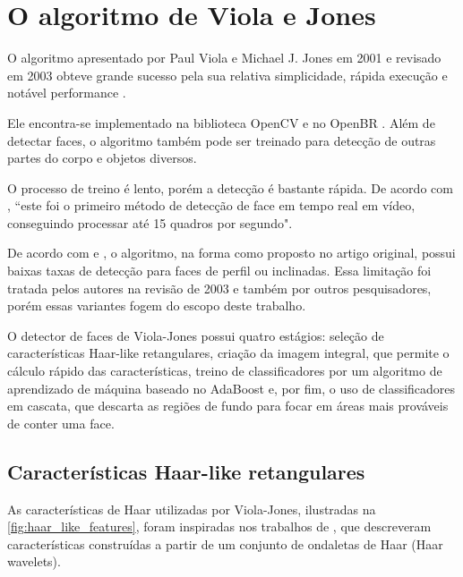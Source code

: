 \chapter{O algoritmo de Viola e Jones}\label{cap:viola_jones}


O algoritmo apresentado por Paul Viola e Michael J. Jones em 2001 \cite{Viola01rapidobject, viola2004robust} e revisado em 2003 \cite{jones2003fast} obteve grande sucesso pela sua relativa simplicidade, rápida execução e notável performance \cite{jensen2008implementing}.

Ele encontra-se implementado na biblioteca OpenCV \cite{bradski2000intel, opencvdocs} e no OpenBR \cite{klontz2013open}. Além de detectar faces, o algoritmo também pode ser treinado para detecção de outras partes do corpo \cite{mustafa2014obscenity} e objetos diversos.

O processo de treino é lento, porém a detecção é bastante rápida. De acordo com , ``este foi o primeiro método de detecção de face em tempo real em vídeo, conseguindo processar até 15 quadros por segundo".

De acordo com  e , o algoritmo, na forma como proposto no artigo original, possui baixas taxas de detecção para faces de perfil ou inclinadas. Essa limitação foi tratada pelos autores na revisão de 2003 \cite{jones2003fast} e também por outros pesquisadores, porém essas variantes fogem do escopo deste trabalho.

O detector de faces de Viola-Jones possui quatro estágios: seleção de características Haar-like retangulares, criação da imagem integral, que permite o cálculo rápido das características, treino de classificadores por um algoritmo de aprendizado de máquina baseado no AdaBoost e, por fim, o uso de classificadores em cascata, que descarta as regiões de fundo para focar em áreas mais prováveis de conter uma face.


\section{Características Haar-like retangulares}\label{sec:haar_features}

As características de Haar utilizadas por Viola-Jones, ilustradas na \autoref{fig:haar_like_features}, foram inspiradas nos trabalhos de , que descreveram características construídas a partir de um conjunto de ondaletas de Haar (Haar wavelets).

